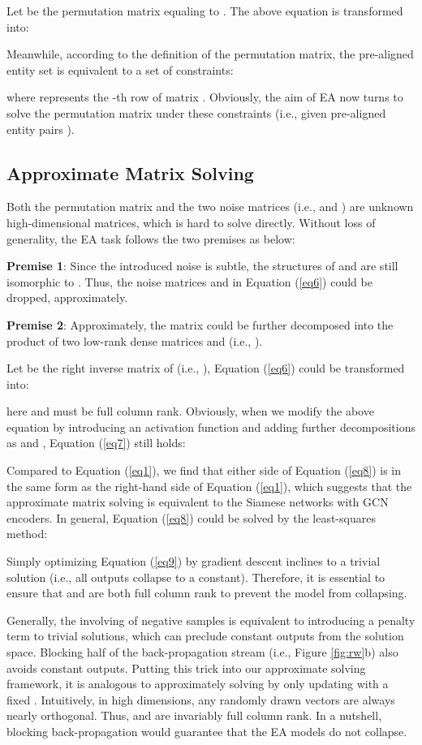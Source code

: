\documentclass[sigconf]{acmart}
\begin{document}
Let  be the permutation matrix equaling to . The above equation is transformed into:

Meanwhile, according to the definition of the permutation matrix, the pre-aligned entity set  is equivalent to a set of constraints:

where  represents the -th row of matrix .
Obviously, the aim of EA now turns to solve the permutation matrix  under these constraints (i.e., given pre-aligned entity pairs ).

\vspace{-0.5em}
\subsection{Approximate Matrix Solving}
\label{sec:AS}

Both the permutation matrix  and the two noise matrices (i.e.,  and ) are unknown high-dimensional matrices, which is hard to solve directly. 
Without loss of generality, the EA task follows the two premises as below:

\textbf{Premise 1}:
Since the introduced noise is subtle, the structures of  and  are still isomorphic to .
Thus, the noise matrices  and  in Equation (\ref{eq6}) could be dropped, approximately.

\textbf{Premise 2}: Approximately, the matrix  could be further decomposed into the product of two low-rank dense matrices  and  (i.e., ).

Let  be the right inverse matrix of  (i.e., ), Equation (\ref{eq6}) could be transformed into:

here  and  must be full column rank.
Obviously, when we modify the above equation by introducing an activation function  and adding further decompositions as  and , Equation (\ref{eq7}) still holds:

Compared to Equation (\ref{eq1}), we find that either side of Equation (\ref{eq8}) is in the same form as the right-hand side of Equation (\ref{eq1}), which suggests that the approximate matrix solving is equivalent to the Siamese networks with GCN encoders.
In general, Equation (\ref{eq8}) could be solved by the least-squares method:

Simply optimizing Equation (\ref{eq9}) by gradient descent inclines to a trivial solution \cite{DBLP:journals/corr/abs-2011-10566} (i.e., all outputs collapse to a constant).
Therefore, it is essential to ensure that  and  are both full column rank to prevent the model from collapsing.

Generally, the involving of negative samples is equivalent to introducing a penalty term to trivial solutions, which can preclude constant outputs from the solution space.
Blocking half of the back-propagation stream (i.e., Figure \ref{fig:rw}b) also avoids constant outputs.
Putting this trick into our approximate solving framework, it is analogous to approximately solving  by only updating  with a fixed .
Intuitively, in high dimensions, any randomly drawn vectors are always nearly orthogonal.
Thus,  and  are invariably full column rank.
In a nutshell, blocking back-propagation would guarantee that the EA models do not collapse.
\end{document}
